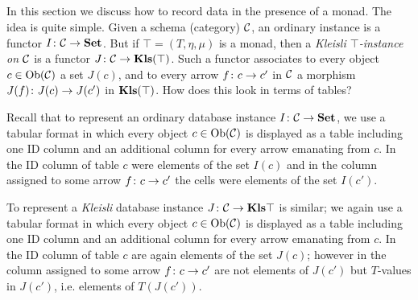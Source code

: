 \documentclass[CT4S-EN-RU]{subfiles}
\begin{document}

\subsection{}\label{sec:monads in db}

In this section we discuss how to record data in the presence of a monad. The idea is quite simple. Given a schema (category) $\mathcal{C}$, an ordinary instance is a functor $I\colon\mathcal{C}\rightarrow{\bf Set}$. But if $\top=(T,\eta,\mu)$ is a monad, then a {\em Kleisli $\top$-instance on $\mathcal{C}$} is a functor $J\colon\mathcal{C}\rightarrow{\bf Kls}(\top)$. Such a functor associates to every object $c\in\textnormal{Ob}(\mathcal{C})$ a set $J(c)$, and to every arrow $f\colon c\rightarrow c'$ in $\mathcal{C}$ a morphism $J(f)\colon J(c)\rightarrow J(c')$ in ${\bf Kls}(\top)$. How does this look in terms of tables?

Recall that to represent an ordinary database instance $I\colon\mathcal{C}\rightarrow{\bf Set}$, we use a tabular format in which every object $c\in\textnormal{Ob}(\mathcal{C})$ is displayed as a table including one ID column and an additional column for every arrow emanating from $c$. In the ID column of table $c$ were elements of the set $I(c)$ and in the column assigned to some arrow $f\colon c\rightarrow c'$ the cells were elements of the set $I(c')$. 

To represent a {\em Kleisli} database instance $J\colon\mathcal{C}\rightarrow{\bf Kls}{\top}$ is similar; we again use a tabular format in which every object $c\in\textnormal{Ob}(\mathcal{C})$ is displayed as a table including one ID column and an additional column for every arrow emanating from $c$. In the ID column of table $c$ are again elements of the set $J(c)$; however in the column assigned to some arrow $f\colon c\rightarrow c'$ are not elements of $J(c')$ but $T$-values in $J(c')$, i.e. elements of $T(J(c'))$. 
\end{document}
